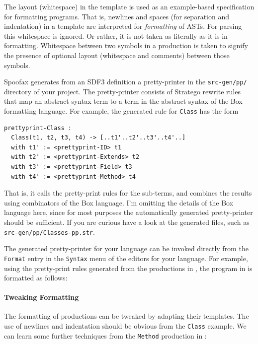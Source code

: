 The layout (whitespace) in the template is used as an example-based
specification for formatting programs. That is, newlines and spaces (for
separation and indentation) in a template are interpreted for \emph{formatting}
of ASTs. For parsing this whitespace is ignored. Or rather, it is not taken as
literally as it is in formatting. Whitespace between two symbols in a production
is taken to signify the presence of optional layout (whitespace and comments)
between those symbols.

Spoofax generates from an SDF3 definition a pretty-printer in the
\texttt{src-gen/pp/} directory of your project. The pretty-printer consists of
Stratego rewrite rules that map an abstract syntax term to a term in the
abstract syntax of the Box formatting language. For example, the generated rule
for \texttt{Class} has the form

\begin{lstlisting}[language=Stratego]
prettyprint-Class :
  Class(t1, t2, t3, t4) -> [..t1'..t2'..t3'..t4'..]
  with t1' := <prettyprint-ID> t1
  with t2' := <prettyprint-Extends> t2
  with t3' := <prettyprint-Field> t3
  with t4' := <prettyprint-Method> t4
\end{lstlisting}

That is, it calls the pretty-print rules for the sub-terms, and combines the
results using combinators of the Box language. I'm omitting the details of the
Box language here, since for most purposes the automatically generated
pretty-printer should be sufficient. If you are curious
have a look at the generated files, such as \texttt{src-gen/pp/Classes-pp.str}.

The generated pretty-printer for your language can be invoked directly from the
\texttt{Format} entry in the \texttt{Syntax} menu of the editors for your
language.
For example, using the pretty-print rules generated from the productions in
, the program in  is formatted as
follows:



\paragraph{Tweaking Formatting}

The formatting of productions can be tweaked by adapting their templates. The
use of newlines and indentation should be obvious from the \texttt{Class}
example. We can learn some further techniques from the \texttt{Method}
production in :

